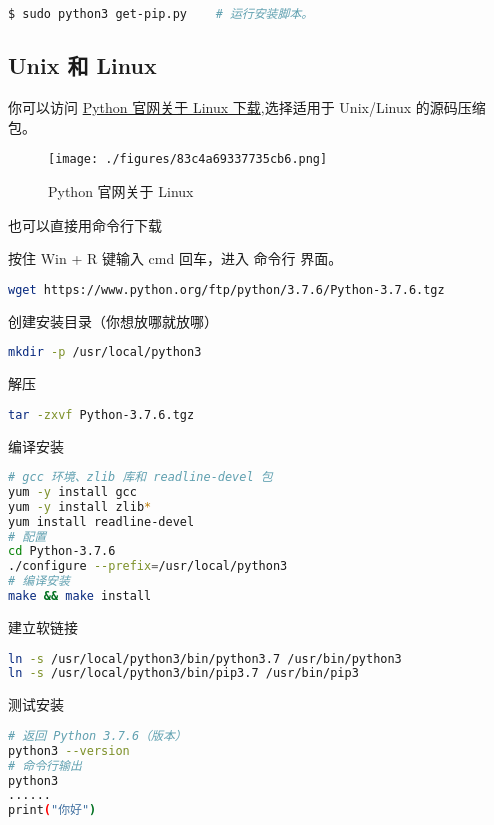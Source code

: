 \begin{lstlisting}[language=bash]
$ sudo python3 get-pip.py    # 运行安装脚本。
\end{lstlisting}

\subsection{Unix 和 Linux}\label{sub_Pyc1_3} 

你可以访问 \href{https://www.python.org/downloads/source/}{Python 官网关于 Linux 下载},选择适用于 Unix/Linux 的源码压缩包。
\begin{figure}[ht]
\centering
\texttt{[image: ./figures/83c4a69337735cb6.png]}
\caption{Python 官网关于 Linux} \label{fig_Python_2}
\end{figure}

也可以直接用命令行下载

按住 Win + R 键输入 cmd 回车，进入 命令行 界面。

\begin{lstlisting}[language=bash]
wget https://www.python.org/ftp/python/3.7.6/Python-3.7.6.tgz
\end{lstlisting}

创建安装目录（你想放哪就放哪）
\begin{lstlisting}[language=bash]
mkdir -p /usr/local/python3
\end{lstlisting}

解压
\begin{lstlisting}[language=bash]
tar -zxvf Python-3.7.6.tgz
\end{lstlisting}

编译安装
\begin{lstlisting}[language=bash]
# gcc 环境、zlib 库和 readline-devel 包
yum -y install gcc
yum -y install zlib*
yum install readline-devel
# 配置
cd Python-3.7.6
./configure --prefix=/usr/local/python3
# 编译安装
make && make install
\end{lstlisting}

建立软链接
\begin{lstlisting}[language=bash]
ln -s /usr/local/python3/bin/python3.7 /usr/bin/python3
ln -s /usr/local/python3/bin/pip3.7 /usr/bin/pip3
\end{lstlisting}

测试安装
\begin{lstlisting}[language=bash]
# 返回 Python 3.7.6（版本）
python3 --version
# 命令行输出
python3
......
print("你好")
\end{lstlisting}

